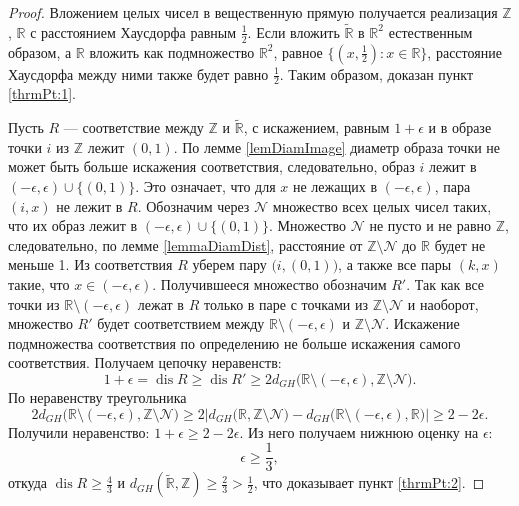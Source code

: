 \documentclass[11pt,twoside,draft
]{article}
\DeclareMathOperator{\dis}{dis}
\begin{document}
\begin{proof}
	Вложением целых чисел в вещественную прямую получается реализация $\mathbb{Z}$, $\mathbb{R}$ с расстоянием Хаусдорфа равным $\frac 1 2$.
	Если вложить $\widetilde{\mathbb{R}}$ в $\mathbb{R}^{2}$ естественным образом, а $\mathbb{R}$ вложить как подмножество $\mathbb{R}^{2}$, равное $\bigl\{(x, \frac1 2 ):x\in \mathbb{R}\bigr\}$,
	расстояние Хаусдорфа между ними также будет равно $\frac 1 2$. Таким образом, доказан пункт \ref{thrmPt:1}.
	
	Пусть $R$ --- соответствие
	между $\mathbb{Z}$ и $\widetilde{\mathbb{R}}$, с искажением,
	равным $1 + \epsilon$ и
	в образе точки $i$ из $\mathbb{Z}$ лежит $(0,1)$. По лемме \ref{lemDiamImage} диаметр
	образа точки не может быть больше искажения соответствия,
	следовательно, образ $i$ лежит в $(-\epsilon, \epsilon) \cup \bigl\{(0,1)\bigr\}$. Это
	означает, что для
	$x$ не лежащих в $(-\epsilon, \epsilon)$, пара $(i, x)$ не лежит в $R$.
	Обозначим через $\mathcal{N}$ множество всех целых чисел таких, что их
	образ лежит в $(-\epsilon, \epsilon) \cup \bigl\{(0,1)\bigr\}$. Множество
	$\mathcal{N}$ не пусто и не равно $\mathbb{Z}$, следовательно, по лемме \ref{lemmaDiamDist},
	расстояние от $\mathbb{Z} \setminus\mathcal{N}$ до $\mathbb{R}$ будет не
	меньше 1.
	Из соответствия $R$ уберем пару $\bigl(i,(0,1)\bigr)$, а также
	все пары $(k,x)$ такие, что $x \in  (-\epsilon, \epsilon)$.
	Получившееся множество обозначим $R'$.
	Так как все точки из $\mathbb{R}\setminus(-\epsilon, \epsilon)$ лежат в $R$
	только в паре с точками из $ \mathbb{Z} \setminus\mathcal{N}$ и наоборот,
	множество $R'$ будет соответствием между
	$\mathbb{R}\setminus(-\epsilon, \epsilon)$ и
	$ \mathbb{Z} \setminus\mathcal{N}$. Искажение
	подмножества соответствия по определению не больше искажения
	самого соответствия. Получаем цепочку неравенств:
	\[1+\epsilon = \dis R \ge \dis R' \ge 2d_{GH}\bigl(\mathbb{R}\setminus(-\epsilon, \epsilon), \mathbb{Z} \setminus \mathcal{N}\bigr).\]
	По неравенству треугольника
	\[
	2d_{GH}\bigl(\mathbb{R}\setminus(-\epsilon, \epsilon), \mathbb{Z} \setminus \mathcal{N}\bigr) \ge
	2\Big|d_{GH}\bigl(\mathbb{R}, \mathbb{Z} \setminus \mathcal{N}\bigr) - d_{GH}\bigl(\mathbb{R}\setminus(-\epsilon, \epsilon), \mathbb{R}\bigr)\Big| \ge 2 - 2\epsilon.
	\]
	Получили неравенство: $1 + \epsilon \ge 2 - 2\epsilon$.
	Из него получаем нижнюю оценку на $\epsilon$:
	\[\epsilon \ge \frac 1 3,\]
	откуда $\dis R \ge \frac 4 3$ и
	$d_{GH}\left(\widetilde{\mathbb{R}}, \mathbb{Z}\right) \ge \frac 2 3 > \frac 1 2$,
	что доказывает пункт \ref{thrmPt:2}.
\end{proof}
\end{document}
